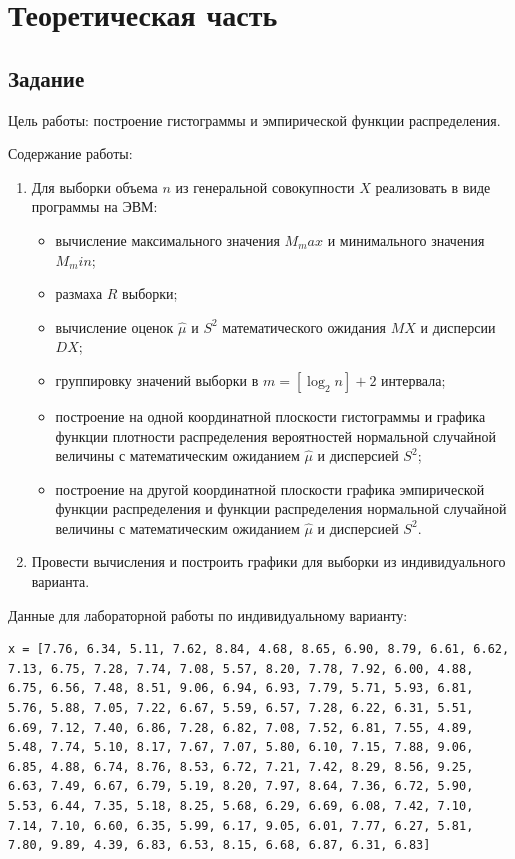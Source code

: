 \setcounter{page}{3}
\chapter{Теоретическая часть}

\section{Задание}

Цель работы: построение гистограммы и эмпирической функции распределения.

Содержание работы:
\begin{enumerate}
	\item Для выборки объема $n$ из генеральной совокупности $X$ реализовать в виде программы на ЭВМ: \begin{itemize}
		\item вычисление максимального значения $M_max$ и минимального значения $M_min$;
		\item размаха $R$ выборки;
		\item вычисление оценок $\hat{\mu}$ и $S^2$ математического ожидания $MX$ и дисперсии $DX$;
		\item группировку значений выборки в $m = [\log_2{n}] + 2$ интервала;
		\item построение на одной координатной плоскости гистограммы и графика функции плотности распределения вероятностей нормальной случайной величины с математическим ожиданием $\hat{\mu}$ и дисперсией $S^2$;
		\item построение на другой координатной плоскости графика эмпирической функции распределения и функции распределения нормальной случайной величины с математическим ожиданием $\hat{\mu}$ и дисперсией $S^2$.
	\end{itemize}
	\item Провести вычисления и построить графики для выборки из индивидуального варианта.
\end{enumerate} 

Данные для лабораторной работы по индивидуальному варианту:

\begin{lstlisting}[caption={Выборка для варианта №8}]
x = [7.76, 6.34, 5.11, 7.62, 8.84, 4.68, 8.65, 6.90, 8.79, 6.61, 6.62, 7.13, 6.75, 7.28, 7.74, 7.08, 5.57, 8.20, 7.78, 7.92, 6.00, 4.88, 6.75, 6.56, 7.48, 8.51, 9.06, 6.94, 6.93, 7.79, 5.71, 5.93, 6.81, 5.76, 5.88, 7.05, 7.22, 6.67, 5.59, 6.57, 7.28, 6.22, 6.31, 5.51, 6.69, 7.12, 7.40, 6.86, 7.28, 6.82, 7.08, 7.52, 6.81, 7.55, 4.89, 5.48, 7.74, 5.10, 8.17, 7.67, 7.07, 5.80, 6.10, 7.15, 7.88, 9.06, 6.85, 4.88, 6.74, 8.76, 8.53, 6.72, 7.21, 7.42, 8.29, 8.56, 9.25, 6.63, 7.49, 6.67, 6.79, 5.19, 8.20, 7.97, 8.64, 7.36, 6.72, 5.90, 5.53, 6.44, 7.35, 5.18, 8.25, 5.68, 6.29, 6.69, 6.08, 7.42, 7.10, 7.14, 7.10, 6.60, 6.35, 5.99, 6.17, 9.05, 6.01, 7.77, 6.27, 5.81, 7.80, 9.89, 4.39, 6.83, 6.53, 8.15, 6.68, 6.87, 6.31, 6.83]
\end{lstlisting}

